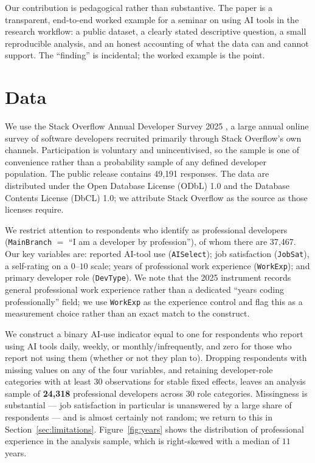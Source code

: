 \documentclass[11pt]{article}
\begin{document}
Our contribution is pedagogical rather than substantive. The paper is a
transparent, end-to-end worked example for a seminar on using AI tools in
the research workflow: a public dataset, a clearly stated descriptive
question, a small reproducible analysis, and an honest accounting of what
the data can and cannot support. The ``finding'' is incidental; the worked
example is the point.

\section{Data}
\label{sec:data}
We use the Stack Overflow Annual Developer Survey 2025
\citep{stackoverflow2025survey}, a large annual online survey of software
developers recruited primarily through Stack Overflow's own channels.
Participation is voluntary and unincentivised, so the sample is one of
convenience rather than a probability sample of any defined developer
population. The public release contains 49{,}191 responses. The data are
distributed under the Open Database License (ODbL) 1.0 and the Database
Contents License (DbCL) 1.0; we attribute Stack Overflow as the source as
those licenses require.

We restrict attention to respondents who identify as professional
developers (\texttt{MainBranch} $=$ ``I am a developer by profession''),
of whom there are 37{,}467. Our key variables are: reported AI-tool use
(\texttt{AISelect}); job satisfaction (\texttt{JobSat}), a self-rating on a
$0$--$10$ scale; years of professional work experience (\texttt{WorkExp});
and primary developer role (\texttt{DevType}). We note that the 2025
instrument records general professional work experience rather than a
dedicated ``years coding professionally'' field; we use \texttt{WorkExp} as
the experience control and flag this as a measurement choice rather than an
exact match to the construct.

We construct a binary AI-use indicator equal to one for respondents who
report using AI tools daily, weekly, or monthly/infrequently, and zero for
those who report not using them (whether or not they plan to). Dropping
respondents with missing values on any of the four variables, and retaining
developer-role categories with at least $30$ observations for stable fixed
effects, leaves an analysis sample of \textbf{24{,}318} professional
developers across $30$ role categories. Missingness is substantial ---
job satisfaction in particular is unanswered by a large share of
respondents --- and is almost certainly not random; we return to this in
Section~\ref{sec:limitations}. Figure~\ref{fig:years} shows the
distribution of professional experience in the analysis sample, which is
right-skewed with a median of $11$ years.
\end{document}
